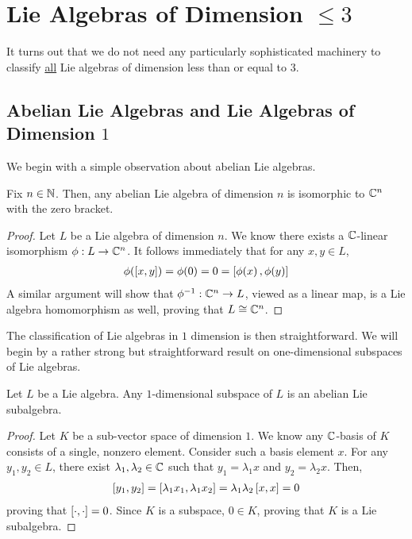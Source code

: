 \section{Lie Algebras of Dimension $\leq 3$}

It turns out that we do not need any particularly sophisticated machinery to classify \underline{all} Lie algebras of dimension less than or equal to $3$.

\subsection{Abelian Lie Algebras and Lie Algebras of Dimension $1$}

We begin with a simple observation about abelian Lie algebras.

\begin{boxproposition}\label{Ch1:Prop:Abelian_Lie_Algebras_Iso}
    Fix $n \in \mathbb{N}$. Then, any abelian Lie algebra of dimension $n$ is isomorphic to $\mathbb{C}^n$ with the zero bracket.
\end{boxproposition}
\begin{proof}
    Let $L$ be a Lie algebra of dimension $n$. We know there exists a $\mathbb{C}$-linear isomorphism $\phi : L \to \mathbb{C}^n$. It follows immediately that for any $x, y \in L$,
    \begin{align*}
        \phi\!\left( \left[ x, y \right] \right) = \phi\!\left( 0 \right) = 0 = \left[ \phi\!\left( x \right), \phi\!\left( y \right) \right]
    \end{align*}
    A similar argument will show that $\phi^{-1} : \mathbb{C}^n \to L$, viewed as a linear map, is a Lie algebra homomorphism as well, proving that $L \cong \mathbb{C}^n$.
\end{proof}

The classification of Lie algebras in $1$ dimension is then straightforward. We will begin by a rather strong but straightforward result on one-dimensional subspaces of Lie algebras.

\begin{boxproposition}\label{Ch1:Prop:1D_Lie_Subalgebras}
    Let $L$ be a Lie algebra. Any $1$-dimensional subspace of $L$ is an abelian Lie subalgebra.
\end{boxproposition}
\begin{proof}
    Let $K$ be a sub-vector space of dimension $1$. We know any $\mathbb{C}$-basis of $K$ consists of a single, nonzero element. Consider such a basis element $x$. For any $y_1, y_2 \in L$, there exist $\lambda_1, \lambda_2 \in \mathbb{C}$ such that $y_1 = \lambda_1 x$ and $y_2 = \lambda_2 x$. Then,
    \begin{align*}
        \left[ y_1, y_2 \right] = \left[ \lambda_1 x_1, \lambda_1 x_2 \right] = \lambda_1 \lambda_2 \left[ x, x \right] = 0
    \end{align*}
    proving that $\left[ \cdot, \cdot \right] = 0$. Since $K$ is a subspace, $0 \in K$, proving that $K$ is a Lie subalgebra.
\end{proof}

